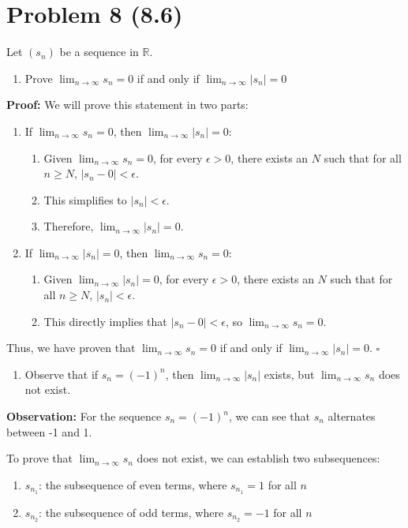 \documentclass{article}
\begin{document}
\section*{Problem 8 (8.6)}
Let $(s_{n})$ be a sequence in $\mathbb{R}$.
\begin{enumerate}
    \item Prove $\lim_{ n \to \infty }s_{n}=0$ if and only if $\lim_{ n \to \infty }|s_{n}|=0$
\end{enumerate}

\textbf{Proof:}
We will prove this statement in two parts:
\begin{enumerate}
    \item If $\lim_{n \to \infty} s_n = 0$, then $\lim_{n \to \infty} |s_n| = 0$:
    \begin{enumerate}
        \item Given $\lim_{n \to \infty} s_n = 0$, for every $\epsilon > 0$, there exists an $N$ such that for all $n \geq N$, $|s_n - 0| < \epsilon$.
        \item This simplifies to $|s_n| < \epsilon$.
        \item Therefore, $\lim_{n \to \infty} |s_n| = 0$.
    \end{enumerate}
    \item If $\lim_{n \to \infty} |s_n| = 0$, then $\lim_{n \to \infty} s_n = 0$:
    \begin{enumerate}
        \item Given $\lim_{n \to \infty} |s_n| = 0$, for every $\epsilon > 0$, there exists an $N$ such that for all $n \geq N$, $|s_n| < \epsilon$.
        \item This directly implies that $|s_n - 0| < \epsilon$, so $\lim_{n \to \infty} s_n = 0$.
    \end{enumerate}
\end{enumerate}
Thus, we have proven that $\lim_{n \to \infty} s_n = 0$ if and only if $\lim_{n \to \infty} |s_n| = 0$. $\square$

\begin{enumerate}[resume]
    \item Observe that if $s_{n}=(-1)^n$, then $\lim_{ n \to \infty }|s_{n}|$ exists, but $\lim_{ n \to \infty }s_{n}$ does not exist.
\end{enumerate}

\textbf{Observation:} For the sequence $s_n = (-1)^n$, we can see that $s_n$ alternates between -1 and 1.

To prove that $\lim_{n \to \infty} s_n$ does not exist, we can establish two subsequences:
\begin{enumerate}
    \item $s_{n_1}$: the subsequence of even terms, where $s_{n_1} = 1$ for all $n$
    \item $s_{n_2}$: the subsequence of odd terms, where $s_{n_2} = -1$ for all $n$
\end{enumerate}
\end{document}
